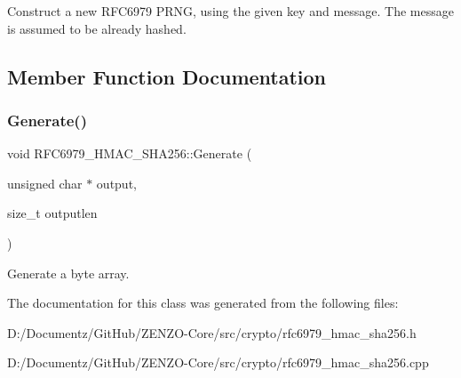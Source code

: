 Construct a new R\+F\+C6979 P\+R\+NG, using the given key and message. The message is assumed to be already hashed. 

\subsection{Member Function Documentation}
\mbox{\label{class_r_f_c6979___h_m_a_c___s_h_a256_a9f841d552097f528631538e9939e0f70}} 
\subsubsection{\texorpdfstring{Generate()}{Generate()}}
{\footnotesize\ttfamily void R\+F\+C6979\+\_\+\+H\+M\+A\+C\+\_\+\+S\+H\+A256\+::\+Generate (\begin{DoxyParamCaption}\item[{unsigned char $\ast$}]{output,  }\item[{size\+\_\+t}]{outputlen }\end{DoxyParamCaption})}

Generate a byte array. 

The documentation for this class was generated from the following files\+:\begin{DoxyCompactItemize}
\item 
D\+:/\+Documentz/\+Git\+Hub/\+Z\+E\+N\+Z\+O-\/\+Core/src/crypto/rfc6979\+\_\+hmac\+\_\+sha256.\+h\item 
D\+:/\+Documentz/\+Git\+Hub/\+Z\+E\+N\+Z\+O-\/\+Core/src/crypto/rfc6979\+\_\+hmac\+\_\+sha256.\+cpp\end{DoxyCompactItemize}
